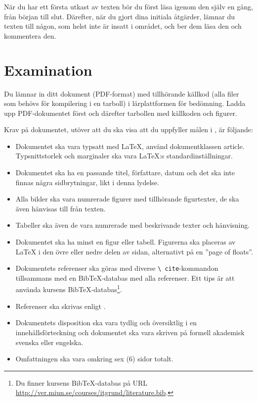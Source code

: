 \documentclass[a4paper]{miunasgn}
\begin{document}
När du har ett första utkast av texten bör du först läsa igenom den själv en 
gång, från början till slut.
Därefter, när du gjort dina initiala åtgärder, lämnar du texten till någon, som 
helst inte är insatt i området, och ber dem läsa den och kommentera den.


\section{Examination}
\label{sec:Examination}
Du lämnar in ditt dokument (PDF-format) med tillhörande källkod (alla filer som 
behövs för kompilering i en tarboll) i lärplattformen för bedömning.
Ladda upp PDF-dokumentet först och därefter tarbollen med källkoden och 
figurer.

Krav på dokumentet, utöver att du ska visa att du uppfyller målen 
i , är följande:
\begin{itemize}
  \item Dokumentet ska vara typsatt med LaTeX, använd dokumentklassen article.
    Typsnittstorlek och marginaler ska vara LaTeX:s standardinställningar.
  \item Dokumentet ska ha en passande titel, författare, datum och det ska inte 
    finnas några sidbrytningar, likt i denna lydelse.
  \item Alla bilder ska vara numrerade figurer med tillhörande figurtexter, de 
    ska även hänvisas till från texten.
  \item Tabeller ska även de vara numrerade med beskrivande texter och 
    hänvisning.
  \item Dokumentet ska ha minst en figur eller tabell.
    Figurerna ska placeras av LaTeX i den övre eller nedre delen av sidan, 
    alternativt på en ''page of floats''.
  \item Dokumentets referenser ska göras med diverse \texttt{\textbackslash 
    cite}-kommandon tillsammans med en BibTeX-databas med alla referenser.
    Ett tips är att använda kursens BibTeX-databas\footnote{%
      Du finner kursens BibTeX-databas på URL 
      \url{http://ver.miun.se/courses/itgrund/literature.bib}.
    }.
  \item Referenser ska skrivas enligt  
    \cite{IEEEcitation}.
  \item Dokumentets disposition ska vara tydlig och översiktlig i en 
    innehållsförteckning och dokumentet ska vara skriven på formell akademisk 
    svenska eller engelska.
  \item Omfattningen ska vara omkring sex (6) sidor totalt.
\end{itemize}


\printbibliography
\end{document}
